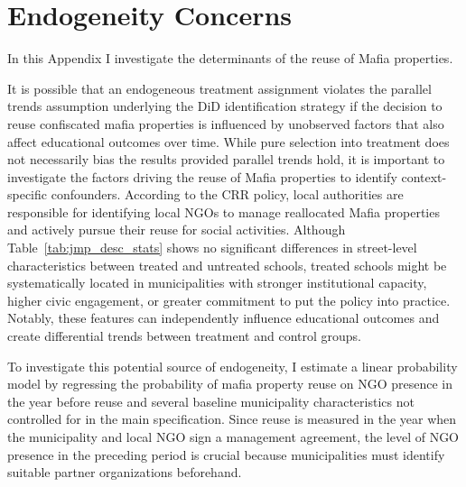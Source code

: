 \documentclass[12pt]{article}
\theoremstyle{plain}
\theoremstyle{plain}
\theoremstyle{plain}
\theoremstyle{definition}
\theoremstyle{plain}
\theoremstyle{definition}
\theoremstyle{plain}
\theoremstyle{remark}
\theoremstyle{definition}
\theoremstyle{definition}
\theoremstyle{plain}
\begin{document}
\newpage

\renewcommand{\thefigure}{C.\arabic{figure}}
\renewcommand{\thetable}{C.\arabic{table}}
\setcounter{figure}{0}
\setcounter{table}{0}
\section{Endogeneity Concerns}
\label{sec:jmp_app_C}

\vspace{-0.3cm}
In this Appendix I investigate the determinants of the reuse of Mafia properties. \par
\vspace{0.2cm}

It is possible that an endogeneous treatment assignment violates the parallel trends assumption underlying the DiD identification strategy if the decision to reuse confiscated mafia properties is influenced by unobserved factors that also affect educational outcomes over time. While pure selection into treatment does not necessarily bias the results provided parallel trends hold, it is important to investigate the factors driving the reuse of Mafia properties to identify context-specific confounders. According to the CRR policy, local authorities are responsible for identifying local NGOs to manage reallocated Mafia properties and actively pursue their reuse for social activities. Although Table~\ref{tab:jmp_desc_stats} shows no significant differences in street-level characteristics between treated and untreated schools, treated schools might be systematically located in municipalities with stronger institutional capacity, higher civic engagement, or greater commitment to  put the policy into practice. Notably, these features can independently influence educational outcomes and create differential trends between treatment and control groups. \par
\medskip
To investigate this potential source of endogeneity, I estimate a linear probability model by regressing the probability of mafia property reuse on NGO presence in the year before reuse and several baseline municipality characteristics not controlled for in the main specification. Since reuse is measured in the year when the municipality and local NGO sign a management agreement, the level of NGO presence in the preceding period is crucial because municipalities must identify suitable partner organizations beforehand.
\end{document}
